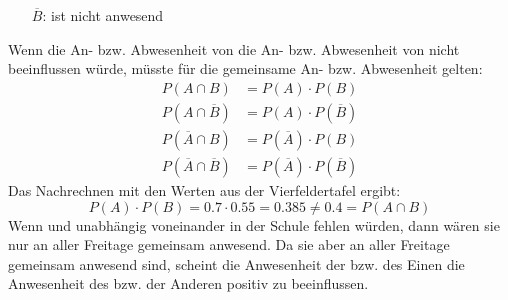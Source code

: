 \begin{exercise}
\begin{minipage}{0.58\linewidth}
\begin{itemize}
        \item[$\overline{B}$:] \glqq\xxb{} ist nicht anwesend\grqq
      \end{itemize}
    \end{minipage}\par
    Wenn die An- bzw. Abwesenheit von \xya{} die
    An- bzw. Abwesenheit von \xxb{} nicht
    beeinflussen würde, müsste für die gemeinsame
    An- bzw. Abwesenheit gelten:
    \begin{equation*}
      \begin{split}
        P(A\cap B)
        &=P(A)\cdot P(B)
        \\
        P(A\cap\overline{B})
        &=P(A)\cdot P(\overline{B})
        \\
        P(\overline{A}\cap B)
        &=P(\overline{A})\cdot P(B)
        \\
        P(\overline{A}\cap\overline{B})
        &=P(\overline{A})\cdot P(\overline{B})
      \end{split}
    \end{equation*}
    Das Nachrechnen mit den Werten aus der
    Vierfeldertafel ergibt:
    \begin{equation*}
      P(A)\cdot P(B)=
      \num{0.7}\cdot\num{0.55}=\num{0.385}
      \neq
      \num{0.4}=P(A\cap B)
    \end{equation*}
    Wenn \xya{} und \xxb{} unabhängig voneinander
    in der Schule fehlen würden, dann wären sie nur
    an  aller Freitage gemeinsam anwesend.
    Da sie aber an  aller Freitage gemeinsam
    anwesend sind, scheint die Anwesenheit der bzw.
    des Einen die Anwesenheit des bzw. der Anderen
    positiv zu beeinflussen.
  \fi
\end{exercise}
